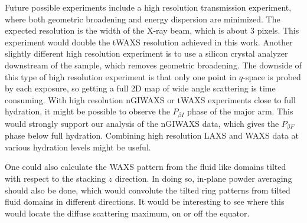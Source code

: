 Future possible experiments
include a high resolution transmission experiment, where both geometric 
broadening and energy dispersion are minimized. The expected resolution 
is the width of the X-ray beam, which is about 3 pixels. This experiment 
would double the tWAXS resolution achieved in this work. 
Another slightly different high resolution experiment is to use a silicon 
crystal analyzer downstream of the sample, which removes geometric
broadening. The downside of this type of high resolution experiment is that
only one point in $q$-space is probed 
by each exposure, so getting a full
2D map of wide angle scattering is time consuming.  
With high resolution nGIWAXS or tWAXS experiments
close to full hydration, it might be possible to observe 
the $P_{\beta I}$ phase of the major arm. This would strongly support
our analysis of the nGIWAXS data,
which gives the $P_{\beta F}$ phase below full hydration.
Combining high resolution LAXS and WAXS data at various hydration levels
might be useful.


One could also calculate the WAXS pattern from the fluid like domains tilted 
with respect to the stacking $z$ direction. In doing so, in-plane powder averaging
should also be done, which would convolute the tilted ring patterns from 
tilted fluid domains in different directions. It would be interesting to
see where this would locate the diffuse scattering maximum,
on or off the equator.
 



